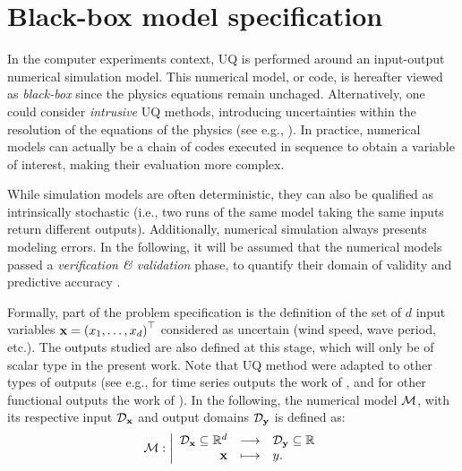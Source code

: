 \section{Black-box model specification} \label{sec:model_spec}
In the computer experiments context, UQ is performed around an input-output numerical simulation model. 
This numerical model, or code, is hereafter viewed as \textit{black-box} since the physics equations remain unchaged. 
Alternatively, one could consider \textit{intrusive} UQ methods, introducing uncertainties within the resolution of the equations of the physics (see e.g., \citealp{lemaitre_2010}). 
In practice, numerical models can actually be a chain of codes executed in sequence to obtain a variable of interest, making their evaluation more complex.

While simulation models are often deterministic, they can also be qualified as intrinsically stochastic (i.e., two runs of the same model taking the same inputs return different outputs).
Additionally, numerical simulation always presents modeling errors. 
In the following, it will be assumed that the numerical models passed a \textit{verification \& validation} phase, to quantify their domain of validity and predictive accuracy \citep{damblin_2015}. 

Formally, part of the problem specification is the definition of the set of $d$ input variables ${\bf x} = \left(x_1, \dots, x_d\right)^\top$ considered as uncertain (wind speed, wave period, etc.). 
The outputs studied are also defined at this stage, which will only be of scalar type in the present work.  
Note that UQ method were adapted to other types of outputs (see e.g., for time series outputs the work of \citealp{lataniotis_2019}, and for other functional outputs the work of \citealp{auder_2012,rollon_2021}). 
In the following, the numerical model $\mathcal{M}$, with its respective input $\mathcal{D}_{{\bf x}}$ and output domains $\mathcal{D}_{{\bf y}}$ is defined as:
\begin{equation}
\mathcal{M} : \bigg|
    \begin{array}{rcl}
        \mathcal{D}_{{\bf x}} \subseteq \mathbb{R}^d & \longrightarrow & \mathcal{D}_{{\bf y}} \subseteq \mathbb{R} \\
        {\bf x} & \longmapsto & y.
    \end{array}
    \label{eq:numerical_model}
\end{equation}

